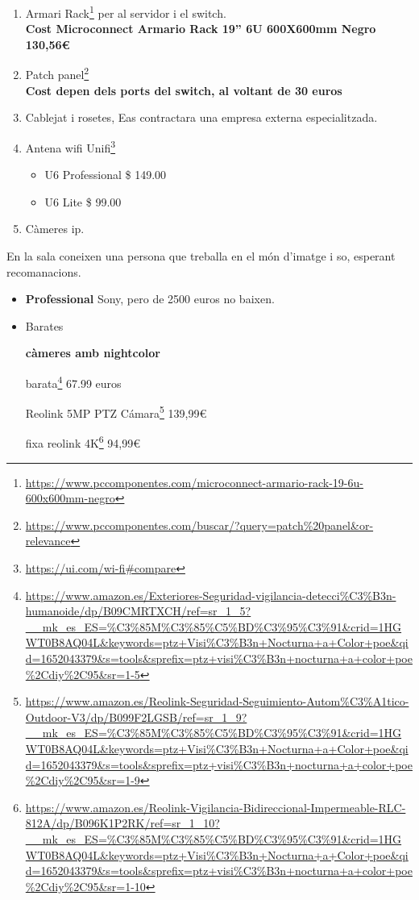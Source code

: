 \documentclass[
  10pt,
]{krantz}
\DeclareRobustCommand{\href}[2]{#2\footnote{\url{#1}}}
\providecommand{\tightlist}{%
  \setlength{\itemsep}{0pt}\setlength{\parskip}{0pt}}
\begin{document}
\begin{enumerate}
\def\labelenumi{\arabic{enumi}.}
\item
  Armari \href{https://www.pccomponentes.com/microconnect-armario-rack-19-6u-600x600mm-negro}{Rack} per al servidor i el switch.\\
  \textbf{Cost Microconnect Armario Rack 19'' 6U 600X600mm Negro 130,56€}
\item
  \href{https://www.pccomponentes.com/buscar/?query=patch\%20panel\&or-relevance}{Patch panel}\\
  \textbf{Cost depen dels ports del switch, al voltant de 30 euros}
\item
  Cablejat i rosetes, Eas contractara una empresa externa especialitzada.
\item
  Antena \href{https://ui.com/wi-fi\#compare}{wifi Unifi}

  \begin{itemize}
  \tightlist
  \item
    U6 Professional \$ 149.00
  \item
    U6 Lite \$ 99.00
  \end{itemize}
\item
  Càmeres ip.
\end{enumerate}

En la sala coneixen una persona que treballa en el món d'imatge i so, esperant recomanacions.

\begin{itemize}
\item
  \textbf{Professional} Sony, pero de 2500 euros no baixen.
\item
  Barates

  \textbf{càmeres amb nightcolor}

  \href{https://www.amazon.es/Exteriores-Seguridad-vigilancia-detecci\%C3\%B3n-humanoide/dp/B09CMRTXCH/ref=sr_1_5?__mk_es_ES=\%C3\%85M\%C3\%85\%C5\%BD\%C3\%95\%C3\%91\&crid=1HGWT0B8AQ04L\&keywords=ptz+Visi\%C3\%B3n+Nocturna+a+Color+poe\&qid=1652043379\&s=tools\&sprefix=ptz+visi\%C3\%B3n+nocturna+a+color+poe\%2Cdiy\%2C95\&sr=1-5}{barata} 67.99 euros

  \href{https://www.amazon.es/Reolink-Seguridad-Seguimiento-Autom\%C3\%A1tico-Outdoor-V3/dp/B099F2LGSB/ref=sr_1_9?__mk_es_ES=\%C3\%85M\%C3\%85\%C5\%BD\%C3\%95\%C3\%91\&crid=1HGWT0B8AQ04L\&keywords=ptz+Visi\%C3\%B3n+Nocturna+a+Color+poe\&qid=1652043379\&s=tools\&sprefix=ptz+visi\%C3\%B3n+nocturna+a+color+poe\%2Cdiy\%2C95\&sr=1-9}{Reolink 5MP PTZ Cámara} 139,99€

  \href{https://www.amazon.es/Reolink-Vigilancia-Bidireccional-Impermeable-RLC-812A/dp/B096K1P2RK/ref=sr_1_10?__mk_es_ES=\%C3\%85M\%C3\%85\%C5\%BD\%C3\%95\%C3\%91\&crid=1HGWT0B8AQ04L\&keywords=ptz+Visi\%C3\%B3n+Nocturna+a+Color+poe\&qid=1652043379\&s=tools\&sprefix=ptz+visi\%C3\%B3n+nocturna+a+color+poe\%2Cdiy\%2C95\&sr=1-10}{fixa reolink 4K} 94,99€
\end{itemize}
\end{document}
